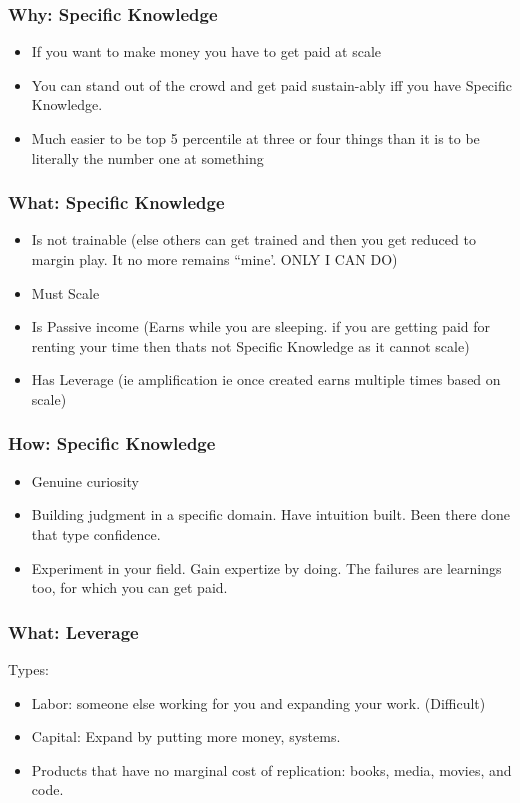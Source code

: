 \begin{frame}[fragile]
\frametitle{Why: Specific Knowledge}
\begin{itemize}
\item If you want to make money you have to get paid at scale
\item You can stand out of the crowd and get paid sustain-ably iff you have Specific Knowledge.
\item  Much easier to be top 5 percentile at three or four things than it is to be literally the number one at something
\end{itemize}
\end{frame}

\begin{frame}[fragile]
\frametitle{What: Specific Knowledge}
\begin{itemize}
\item Is not trainable (else others can get trained and then you get reduced to margin play. It no more remains ``mine'. ONLY I CAN DO)
\item Must Scale
\item Is Passive income (Earns while you are sleeping. if you are getting paid for renting your time then thats not Specific Knowledge as it cannot scale)
\item Has Leverage (ie amplification ie once created earns multiple times based on scale)
\end{itemize}
\end{frame}

\begin{frame}[fragile]
\frametitle{How: Specific Knowledge}
\begin{itemize}
\item Genuine curiosity
\item Building judgment in a specific domain. Have intuition built. Been there done that type confidence.
\item Experiment in your field. Gain expertize by doing. The failures are learnings too, for which you can get paid.
\end{itemize}
\end{frame}

\begin{frame}[fragile]
\frametitle{What: Leverage}
Types:
\begin{itemize}
\item Labor: someone else working for you and expanding your work. (Difficult)
\item Capital: Expand by putting more money, systems.
\item Products that have no marginal cost of replication: books, media, movies, and code.
\end{itemize}
\end{frame}

